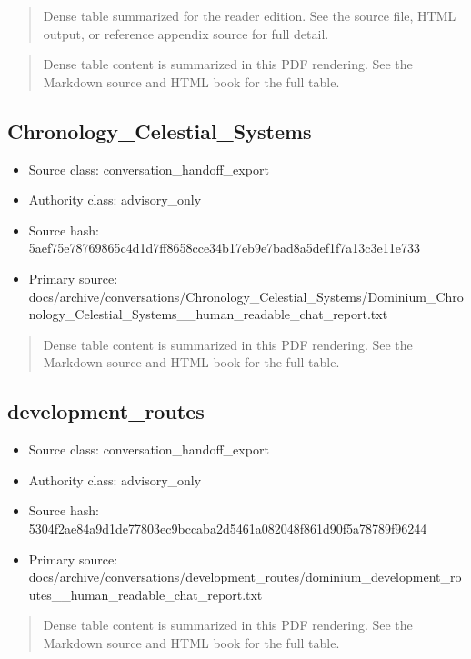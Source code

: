 \documentclass[11pt,a4paper]{report}
\begin{document}
\begin{quote}\small Dense table summarized for the reader edition. See the source file, HTML output, or reference appendix source for full detail.\end{quote}

\begin{quote}\small Dense table content is summarized in this PDF rendering. See the Markdown source and HTML book for the full table.\end{quote}


\subsection{Chronology\_Celestial\_Systems}

\begin{itemize}
\item Source class: conversation\_handoff\_export
\item Authority class: advisory\_only
\item Source hash: 5aef75e78769865c4d1d7ff8658cce34b17eb9e7bad8a5def1f7a13c3e11e733
\item Primary source: docs/archive/conversations/Chronology\_Celestial\_Systems/Dominium\_Chronology\_Celestial\_Systems\_\_human\_readable\_chat\_report.txt
\end{itemize}

\begin{quote}\small Dense table content is summarized in this PDF rendering. See the Markdown source and HTML book for the full table.\end{quote}

\subsection{development\_routes}

\begin{itemize}
\item Source class: conversation\_handoff\_export
\item Authority class: advisory\_only
\item Source hash: 5304f2ae84a9d1de77803ec9bccaba2d5461a082048f861d90f5a78789f96244
\item Primary source: docs/archive/conversations/development\_routes/dominium\_development\_routes\_\_human\_readable\_chat\_report.txt
\end{itemize}

\begin{quote}\small Dense table content is summarized in this PDF rendering. See the Markdown source and HTML book for the full table.\end{quote}
\end{document}
